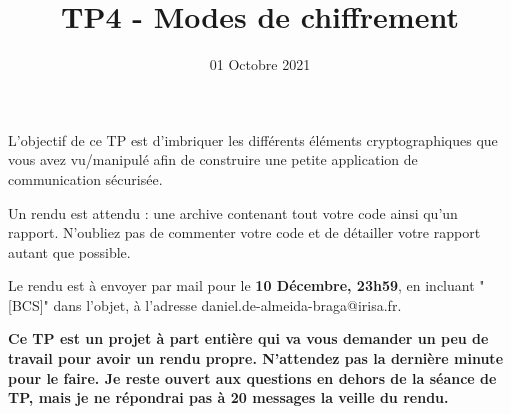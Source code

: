 \documentclass[french,a4paper,11pt]{exam}
\title{\textbf{TP4 - Modes de chiffrement}}
\date{01 Octobre 2021}
\begin{document}
	
	\maketitle
	
	L'objectif de ce TP est d'imbriquer les différents éléments cryptographiques que vous avez vu/manipulé afin de construire une petite application de communication sécurisée.
		
	\noindent Un rendu est attendu : une archive contenant tout votre code ainsi qu'un rapport. N'oubliez pas de commenter votre code et de détailler votre rapport autant que possible.
	
	Le rendu est à envoyer par mail pour le \textbf{10 Décembre, 23h59}, en incluant "[BCS]" dans l'objet, à l'adresse daniel.de-almeida-braga@irisa.fr. 

    \textbf{Ce TP est un projet à part entière qui va vous demander un peu de travail pour avoir un rendu propre. N'attendez pas la dernière minute pour le faire. Je reste ouvert aux questions en dehors de la séance de TP, mais je ne répondrai pas à 20 messages la veille du rendu.}

	\begin{center}
    \end{center}
    
\end{document}
